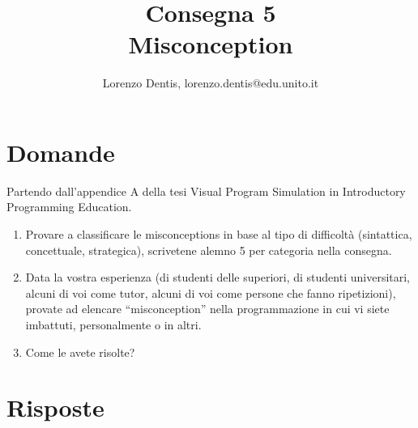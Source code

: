 \documentclass[a4paper]{article}
\begin{document}
\author{Lorenzo Dentis, lorenzo.dentis@edu.unito.it}
\title{Consegna 5 \\ \large Misconception}
\maketitle

\section{Domande}
Partendo dall'appendice A della  tesi Visual Program Simulation in Introductory Programming Education.

\begin{enumerate}

	\item Provare a classificare le misconceptions in base al tipo di  difficoltà (sintattica, concettuale, strategica), scrivetene alemno 5 per categoria nella consegna.
	\item Data la vostra esperienza (di studenti delle superiori, di studenti universitari, alcuni di voi come tutor, alcuni di voi come persone che fanno ripetizioni), provate ad elencare “misconception” nella programmazione in cui vi siete imbattuti, personalmente o in altri.
	\item Come le avete risolte?
\end{enumerate}
\section{Risposte}
\end{document}
